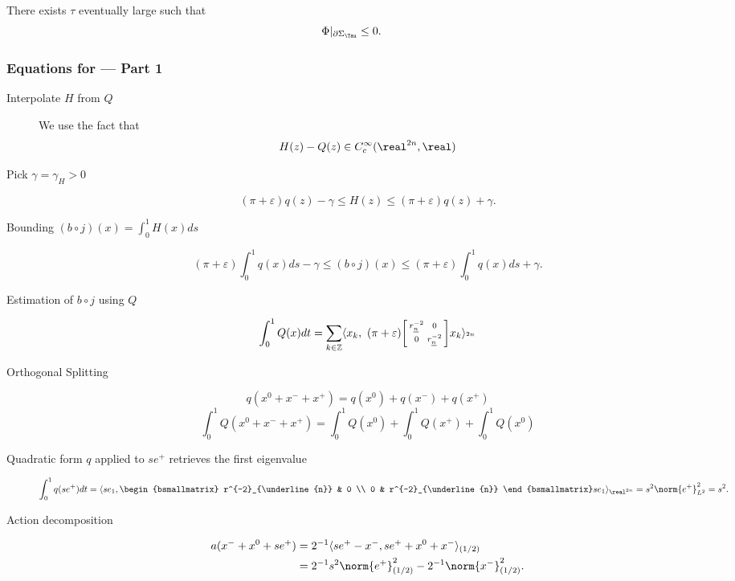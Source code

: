\documentclass[../main-v2-manifolds.tex]{subfiles}
\begin{document}
\begin{wts}\label{thm:non-positive-Sigma-Frame}
    There exists $\tau$ eventually large such that 
    \[
        \Phi\vert_{\partial\Sigma_{\Tau}}\leq 0.
    \]
\end{wts}
\subsubsection*{Equations for  --- Part 1}
    \begin{description}
    \item[Interpolate $H$ from $Q$]
    We use the fact that 
    \[H(z) - Q(z) \in C_c^\infty(\realtn,\real)\]
        \item[Pick $\gamma = \gamma_H>0$]
        \[
            (\pi + \varepsilon)q(z) - \gamma \leq H(z)\leq (\pi + \varepsilon)q(z) + \gamma.
        \]
        \item[Bounding  $(b\circ j)(x) = \int_0^1 H(x)ds$]
        \[
            (\pi + \varepsilon)\int_0^1 q(x)ds - \gamma \leq (b\circ j)(x)\leq (\pi+\varepsilon)\int_0^1 q(x)ds + \gamma.
        \]
    \item[Estimation of $b\circ j$ using $Q$]
    \[
        \int_0^1 Q(x) dt = \sum_{k\in\mathbb{Z}}\langle x_k,\ (\pi + \varepsilon)\begin{bsmallmatrix}
            r^{-2}_{\underline{n}} & 0 \\
            0 & r^{-2}_{\underline{n}} 
        \end{bsmallmatrix}x_k\rangle_{\realtn}
    \]
    \item[Orthogonal Splitting]
    \[
        q(x^0 + x^- + x^+) = q(x^0) + q(x^-) + q(x^+)
    \]
    \[
        \int_0^1 Q(x^0 + x^- + x^+) = \int_0^1 Q(x^0) + \int_0^1 Q(x^+) + \int_0^1 Q(x^0)
    \]

    \item[Quadratic form $q$ applied to $se^+$ retrieves the first eigenvalue]
    \[
        \int_0^1 q(se^+) dt = \langle se_1,\begin{bsmallmatrix}
            r^{-2}_{\underline{n}} & 0 \\
            0 & r^{-2}_{\underline{n}} 
        \end{bsmallmatrix}se_1\rangle_{\realtn} = s^2\norm{e^+}^2_{L^2} = s^2.
    \]    
    \item[Action decomposition]
    \begin{align*}
        a(x^- + x^0 + se^+) &= 2^{-1}\langle se^+ - x^-, se^+ + x^0 + x^-\rangle_{(1/2)}\\
        &= 2^{-1}s^2\norm{e^+}^2_{(1/2)} - 2^{-1}\norm{x^-}^2_{(1/2)}.
    \end{align*}



\end{description}
\end{document}
